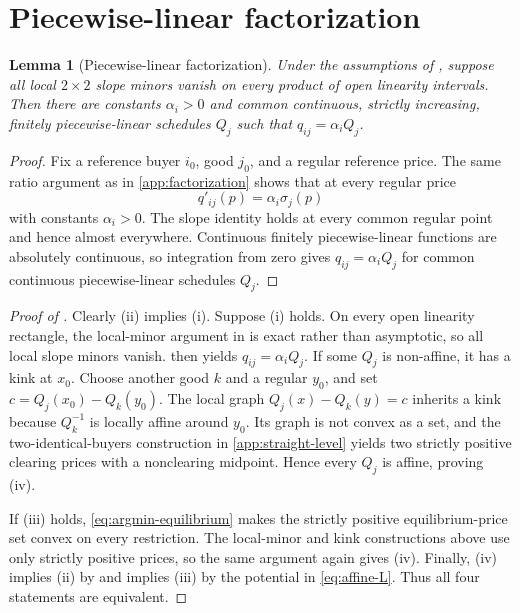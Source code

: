 \documentclass[11pt,a4paper,fleqn]{article}
\theoremstyle{plain}
\newtheorem{lemma}{Lemma}[section]
\theoremstyle{definition}
\begin{document}
\section{Piecewise-linear factorization}\label{app:piecewise-factorization}

\begin{lemma}[Piecewise-linear factorization]\label{lem:piecewise-factorization}
Under the assumptions of , suppose all local $2\times2$ slope minors vanish on every product of open linearity intervals. Then there are constants $\alpha_i>0$ and common continuous, strictly increasing, finitely piecewise-linear schedules $Q_j$ such that $q_{ij}=\alpha_iQ_j$.
\end{lemma}

\begin{proof}
Fix a reference buyer $i_0$, good $j_0$, and a regular reference price. The same ratio argument as in \ref{app:factorization} shows that at every regular price
\[
q'_{ij}(p)=\alpha_i\sigma_j(p)
\]
with constants $\alpha_i>0$. The slope identity holds at every common regular point and hence almost everywhere. Continuous finitely piecewise-linear functions are absolutely continuous, so integration from zero gives $q_{ij}=\alpha_iQ_j$ for common continuous piecewise-linear schedules $Q_j$.
\end{proof}

\begin{proof}[Proof of ]
Clearly (ii) implies (i). Suppose (i) holds. On every open linearity rectangle, the local-minor argument in  is exact rather than asymptotic, so all local slope minors vanish.  then yields $q_{ij}=\alpha_iQ_j$. If some $Q_j$ is non-affine, it has a kink at $x_0$. Choose another good $k$ and a regular $y_0$, and set $c=Q_j(x_0)-Q_k(y_0)$. The local graph $Q_j(x)-Q_k(y)=c$ inherits a kink because $Q_k^{-1}$ is locally affine around $y_0$. Its graph is not convex as a set, and the two-identical-buyers construction in \ref{app:straight-level} yields two strictly positive clearing prices with a nonclearing midpoint. Hence every $Q_j$ is affine, proving (iv).

If (iii) holds, \eqref{eq:argmin-equilibrium} makes the strictly positive equilibrium-price set convex on every restriction. The local-minor and kink constructions above use only strictly positive prices, so the same argument again gives (iv). Finally, (iv) implies (ii) by  and implies (iii) by the potential in \eqref{eq:affine-L}. Thus all four statements are equivalent.
\end{proof}
\end{document}
